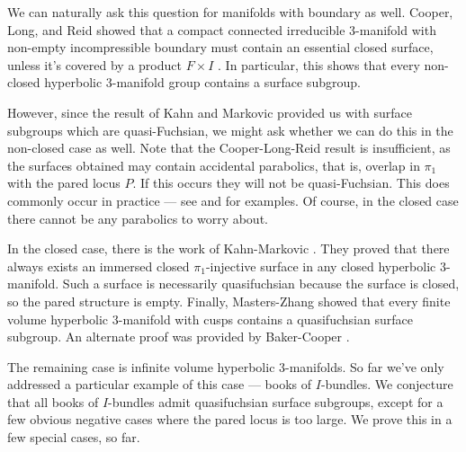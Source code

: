 We can naturally ask this question for manifolds with boundary as well.
Cooper, Long, and Reid showed that a compact connected irreducible 3-manifold
with non-empty incompressible boundary  must contain an essential closed
surface, unless it's covered by a product $F\times I$ \cite{CLR}. In
particular, this shows that every non-closed hyperbolic 3-manifold group
contains a surface subgroup.

However, since the result of Kahn and Markovic provided us with surface
subgroups which are quasi-Fuchsian, we might ask whether we can do this in the
non-closed case as well. Note that the Cooper-Long-Reid result is insufficient,
as the surfaces obtained may contain accidental parabolics, that is, overlap in
$\pi_1$ with the pared locus $P$. If this occurs they will not be
quasi-Fuchsian. This does commonly occur in practice --- see \cite{CLRbundles}
and \cite{MenascoReid} for examples. Of course, in the closed case there cannot
be any parabolics to worry about.


In the closed case, there is the work of Kahn-Markovic \cite{KM}. They proved
that there always exists an immersed closed $\pi_1$-injective surface in any
closed hyperbolic 3-manifold.  Such a surface is necessarily quasifuchsian
because the surface is closed, so the pared structure is empty. Finally,
Masters-Zhang \cite{MZ} showed that every finite volume hyperbolic 3-manifold
with cusps contains a quasifuchsian surface subgroup. An alternate proof was
provided by Baker-Cooper \cite{BC}.

The remaining case is infinite volume hyperbolic 3-manifolds. So far we've only
addressed a particular example of this case --- books of $I$-bundles. We
conjecture that all books of $I$-bundles admit quasifuchsian surface subgroups,
except for a few obvious negative cases where the pared locus is too large. We
prove this in a few special cases, so far.

